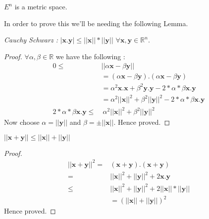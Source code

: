 \begin{Theorem}[name=Euclidean metric space]\label{th:euclidean_space}
$E^n$ is a metric space. 
\end{Theorem}
In order to prove this we'll be needing the following Lemma.
\begin{Lemma}[name=Cauchy Schwarz]{\emph{Cauchy Schwarz :}}
    \label{th:cauchy_schwarz}
    $\lvert \mathbf{x} . \mathbf{y} \rvert \leq \lvert \lvert \mathbf{x} \rvert \rvert * 
    \lvert \lvert \mathbf{y} \rvert \rvert$ $\forall \mathbf{x,y} \in \mathbb{R}^n$.
\end{Lemma}
\begin{proof}
    $\forall \alpha,\beta \in \mathbb{R}$ we have the following :
    \begin{displaymath}
	\begin{aligned}
	    0 \leq  &\lvert \lvert \alpha\mathbf{x} - \beta\mathbf{y} \rvert \rvert \\
	    & = \left(\alpha\mathbf{x} - \beta\mathbf{y}\right). 
	    \left(\alpha\mathbf{x} - \beta\mathbf{y}\right) \\
	    & = \alpha^2 \mathbf{x}.\mathbf{x} + \beta^2 \mathbf{y}.\mathbf{y} -
	    2*\alpha*\beta\mathbf{x}.\mathbf{y} \\
	    & = \alpha^2 \lvert\lvert \mathbf{x} \rvert\rvert ^2 + 
	    \beta^2 \lvert\lvert \mathbf{y} \rvert\rvert ^2 - 2*\alpha *\beta\mathbf{x}.\mathbf{y} \\
	    2*\alpha*\beta\mathbf{x}.\mathbf{y} \leq & \ \alpha^2 \lvert\lvert \mathbf{x}
	    \rvert\rvert ^2 + \beta^2\lvert\lvert \mathbf{y} \rvert\rvert ^2
	\end{aligned}
    \end{displaymath}	
    Now choose $\alpha = \lvert\lvert \mathbf{y} \rvert\rvert$ and $\beta = \pm 
    \lvert\lvert \mathbf{x} \rvert\rvert$. Hence proved.
\end{proof}
\begin{Corollary}
    $\lvert\lvert \mathbf{x} + \mathbf{y} \rvert\rvert \leq \lvert\lvert \mathbf{x} \rvert\rvert +
    \lvert\lvert \mathbf{y}\rvert\rvert$
\end{Corollary}
\begin{proof}
    \begin{displaymath}
	\begin{aligned}
	    \lvert\lvert \mathbf{x} + \mathbf{y}\rvert\rvert ^2  = & \left(\mathbf{x} +
		\mathbf{y}\right) .  \left(\mathbf{x} + \mathbf{y}\right) \\
            = & \lvert\lvert \mathbf{x} \rvert\rvert ^2 + \lvert\lvert \mathbf{y} \rvert\rvert ^2 +
	    2\mathbf{x}.\mathbf{y} \\
            \leq & \lvert\lvert \mathbf{x} \rvert\rvert ^2 + \lvert\lvert \mathbf{y} \rvert\rvert ^2 +
	    2\lvert \lvert \mathbf{x} \rvert\rvert * \lvert \lvert \mathbf{y} \rvert \rvert \\
            & =\left(\lvert\lvert \mathbf{x} \rvert\rvert + \lvert\lvert \mathbf{y} \rvert\rvert
	    \right)^2 	    
	\end{aligned}
    \end{displaymath}
    Hence proved.
\end{proof}
